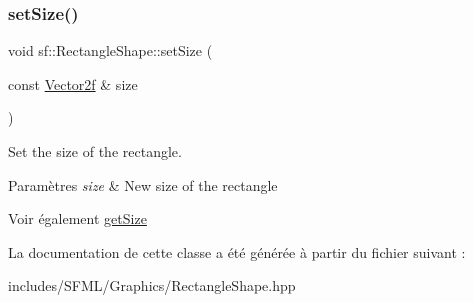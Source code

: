 \subsubsection{\texorpdfstring{set\+Size()}{setSize()}}
{\footnotesize\ttfamily void sf\+::\+Rectangle\+Shape\+::set\+Size (\begin{DoxyParamCaption}\item[{const \hyperlink{classsf_1_1Vector2}{Vector2f} \&}]{size }\end{DoxyParamCaption})}



Set the size of the rectangle. 


\begin{DoxyParams}{Paramètres}
{\em size} & New size of the rectangle\\
\hline
\end{DoxyParams}
\begin{DoxySeeAlso}{Voir également}
\hyperlink{classsf_1_1RectangleShape_ae54a07ff5537bf76de6748f592b34896}{get\+Size} 
\end{DoxySeeAlso}


La documentation de cette classe a été générée à partir du fichier suivant \+:\begin{DoxyCompactItemize}
\item 
includes/\+S\+F\+M\+L/\+Graphics/Rectangle\+Shape.\+hpp\end{DoxyCompactItemize}
